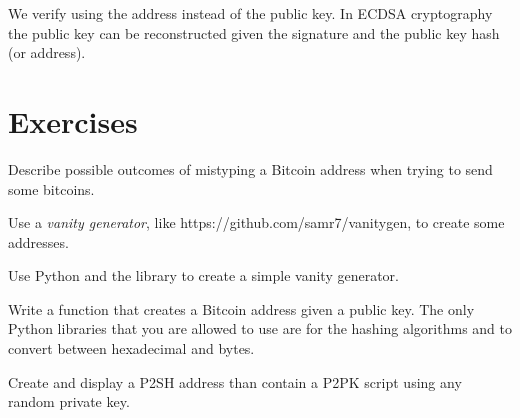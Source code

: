 \begin{note}
We verify using the address instead of the public key. In ECDSA cryptography the public key can be reconstructed given the signature and the public key hash (or address).
\end{note}


\section{Exercises}

\begin{exercise}
Describe possible outcomes of mistyping a Bitcoin address when trying to send some bitcoins.
\end{exercise}

\begin{exercise}
Use a \emph{vanity generator}, like https://github.com/samr7/vanitygen, to create some addresses.
\end{exercise}

\begin{exercise}
Use Python and the  library to create a simple vanity generator.
\end{exercise}

\begin{exercise}
Write a function that creates a Bitcoin address given a public key. The only Python libraries that you are allowed to use are  for the hashing algorithms and  to convert between hexadecimal and bytes.
\end{exercise}

\begin{exercise}
Create and display a P2SH address than contain a P2PK script using any random private key.
\end{exercise}

